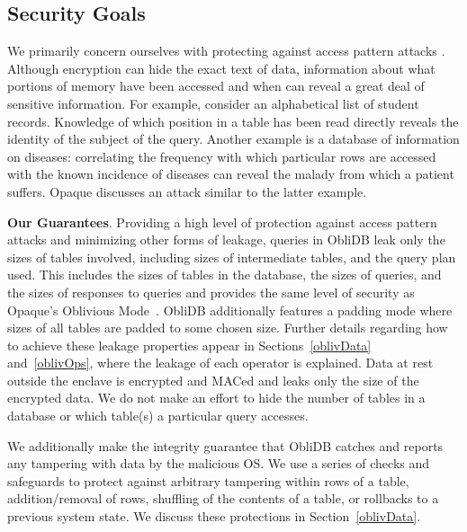\documentclass[letterpaper,twocolumn,10pt]{article}
\def\name/{ObliDB}
\begin{document}
\subsection{Security Goals}
We primarily concern ourselves with protecting against access pattern attacks \cite{IKK12}. Although encryption can hide the exact text of data, information about what portions of memory have been accessed and when can reveal a great deal of sensitive information. For example, consider an alphabetical list of student records. Knowledge of which position in a table has been read directly reveals the identity of the subject of the query. Another example is a database of information on diseases: correlating the frequency with which particular rows are accessed with the known incidence of diseases can reveal the malady from which a patient suffers. Opaque \cite{ZDB+17} discusses an attack similar to the latter example.

\noindent \textbf{Our Guarantees}. Providing a high level of protection against access pattern attacks and minimizing other forms of leakage, queries in \name/ leak only the sizes of tables involved, including sizes of intermediate tables, and the query plan used. This includes the sizes of tables in the database, the sizes of queries, and the sizes of responses to queries and provides the same level of security as Opaque's Oblivious Mode~\cite{ZDB+17}. \name/ additionally features a padding mode where sizes of all tables are padded to some chosen size. Further details regarding how to achieve these leakage properties appear in Sections~\ref{oblivData} and~\ref{oblivOps}, where the leakage of each operator is explained. Data at rest outside the enclave is encrypted and MACed and leaks only the size of the encrypted data. We do not make an effort to hide the number of tables in a database or which table(s) a particular query accesses.

We additionally make the integrity guarantee that \name/ catches and reports any tampering with data by the malicious OS. We use a series of checks and safeguards to protect against arbitrary tampering within rows of a table, addition/removal of rows, shuffling of the contents of a table, or rollbacks to a previous system state. We discuss these protections in Section~\ref{oblivData}.
\end{document}
